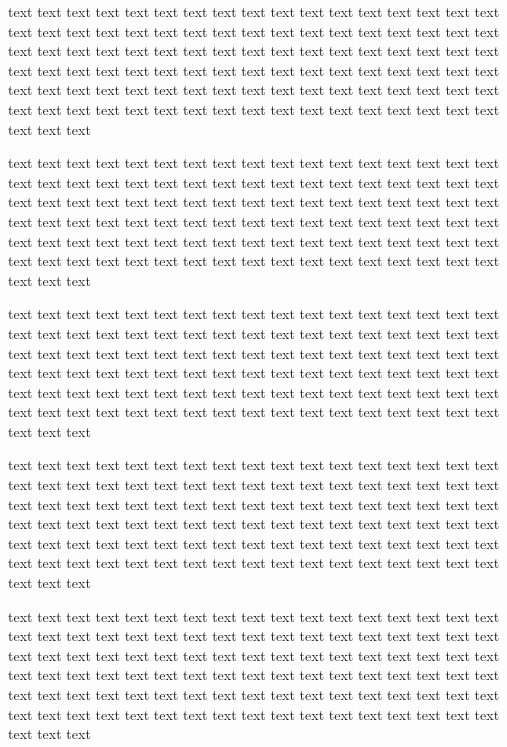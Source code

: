 \documentclass[twocolumn, 10pt, a4paper]{memoir}
\begin{document}
text text text text text text text text text text text text text text text text text text text text text
text text text text text text text text text text text text text text text text text text text text text
text text text text text text text text text text text text text text text text text text text text text
text text text text text text text text text text text text text text text text text text text text text
text text text text text text text text text text text text text text text text text text text text text

text text text text text text text text text text text text text text text text text text text text text
text text text text text text text text text text text text text text text text text text text text text
text text text text text text text text text text text text text text text text text text text text text
text text text text text text text text text text text text text text text text text text text text text
text text text text text text text text text text text text text text text text text text text text text

text text text text text text text text text text text text text text text text text text text text text
text text text text text text text text text text text text text text text text text text text text text
text text text text text text text text text text text text text text text text text text text text text
text text text text text text text text text text text text text text text text text text text text text
text text text text text text text text text text text text text text text text text text text text text

text text text text text text text text text text text text text text text text text text text text text
text text text text text text text text text text text text text text text text text text text text text
text text text text text text text text text text text text text text text text text text text text text
text text text text text text text text text text text text text text text text text text text text text
text text text text text text text text text text text text text text text text text text text text text

text text text text text text text text text text text text text text text text text text text text text
text text text text text text text text text text text text text text text text text text text text text
text text text text text text text text text text text text text text text text text text text text text
text text text text text text text text text text text text text text text text text text text text text
text text text text text text text text text text text text text text text text text text text text text
\end{document}
